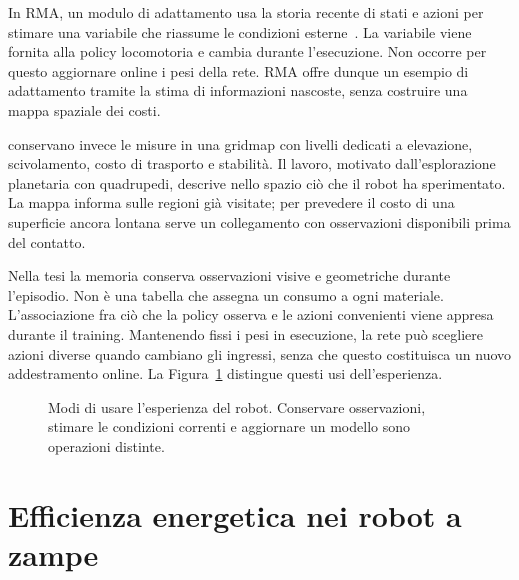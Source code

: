 In RMA, un modulo di adattamento usa la storia recente di stati e azioni per stimare una variabile che riassume le condizioni esterne~\citep{Kumar2021RMA}. La variabile viene fornita alla policy locomotoria e cambia durante l'esecuzione. Non occorre per questo aggiornare online i pesi della rete. RMA offre dunque un esempio di adattamento tramite la stima di informazioni nascoste, senza costruire una mappa spaziale dei costi.

\citet{SanchezDelgado2025Mapping} conservano invece le misure in una gridmap con livelli dedicati a elevazione, scivolamento, costo di trasporto e stabilità. Il lavoro, motivato dall'esplorazione planetaria con quadrupedi, descrive nello spazio ciò che il robot ha sperimentato. La mappa informa sulle regioni già visitate; per prevedere il costo di una superficie ancora lontana serve un collegamento con osservazioni disponibili prima del contatto.

Nella tesi la memoria conserva osservazioni visive e geometriche durante l'episodio. Non è una tabella che assegna un consumo a ogni materiale. L'associazione fra ciò che la policy osserva e le azioni convenienti viene appresa durante il training. Mantenendo fissi i pesi in esecuzione, la rete può scegliere azioni diverse quando cambiano gli ingressi, senza che questo costituisca un nuovo addestramento online. La Figura~\ref{fig:sota-esperienza} distingue questi usi dell'esperienza.

\begin{figure}[tbp]
    \centering
    \caption[Percezione, esperienza e memoria del terreno]{Modi di usare l'esperienza del robot. Conservare osservazioni, stimare le condizioni correnti e aggiornare un modello sono operazioni distinte.}
    \label{fig:sota-esperienza}
\end{figure}

\section{Efficienza energetica nei robot a zampe}
\label{sec:sota-energia}

